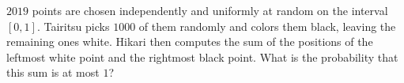 $2019$ points are chosen independently and uniformly at random on the interval $\left[0,1\right]$. Tairitsu picks $1000$ of them randomly and colors them black, leaving the remaining ones white. Hikari then computes the sum of the positions of the leftmost white point and the rightmost black point. What is the probability that this sum is at most $1$?